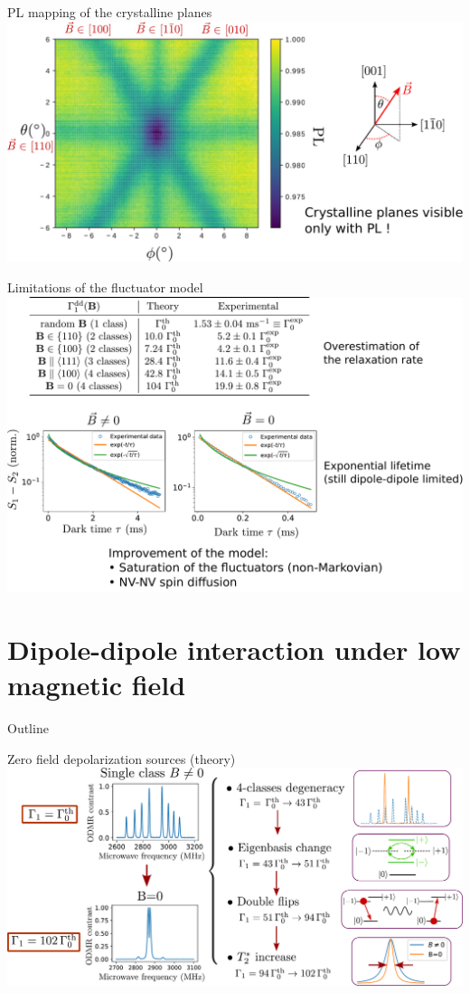 \documentclass{beamer}
\begin{document}
\begin{frame}{PL mapping of the crystalline planes}
\centering
\includegraphics[width=\textwidth,height=0.8\textheight,keepaspectratio]{Slide_carte}
\end{frame}

\begin{frame}{Limitations of the fluctuator model}
\centering
\includegraphics[width=\textwidth,height=0.9\textheight,keepaspectratio]{Slide_limit_fluct}
\end{frame}

\section{Dipole-dipole interaction under low magnetic field}
\begin{frame}{Outline}
\tableofcontents[currentsection]
\end{frame}
\begin{frame}{Zero field depolarization sources (theory)}
\centering
\includegraphics[width=\textwidth,height=0.9\textheight,keepaspectratio]{Slide_0B_theorie}
\end{frame}
\end{document}
